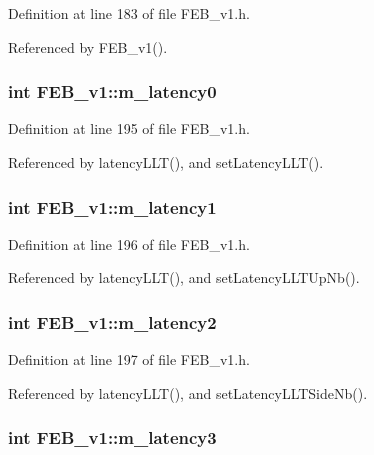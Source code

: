 Definition at line 183 of file FEB\_\-v1.h.

Referenced by FEB\_\-v1().\hypertarget{classFEB__v1_a23a3d8bfbf96490890140f13b08a02c1}{
\subsubsection[{m\_\-latency0}]{\setlength{\rightskip}{0pt plus 5cm}int {\bf FEB\_\-v1::m\_\-latency0}}}
\label{classFEB__v1_a23a3d8bfbf96490890140f13b08a02c1}


Definition at line 195 of file FEB\_\-v1.h.

Referenced by latencyLLT(), and setLatencyLLT().\hypertarget{classFEB__v1_a026d2f4973bf3ddbc404e35264fdef1f}{
\subsubsection[{m\_\-latency1}]{\setlength{\rightskip}{0pt plus 5cm}int {\bf FEB\_\-v1::m\_\-latency1}}}
\label{classFEB__v1_a026d2f4973bf3ddbc404e35264fdef1f}


Definition at line 196 of file FEB\_\-v1.h.

Referenced by latencyLLT(), and setLatencyLLTUpNb().\hypertarget{classFEB__v1_a2c4b18efd76de3bf7089bba57fb6744f}{
\subsubsection[{m\_\-latency2}]{\setlength{\rightskip}{0pt plus 5cm}int {\bf FEB\_\-v1::m\_\-latency2}}}
\label{classFEB__v1_a2c4b18efd76de3bf7089bba57fb6744f}


Definition at line 197 of file FEB\_\-v1.h.

Referenced by latencyLLT(), and setLatencyLLTSideNb().\hypertarget{classFEB__v1_a2f71bdcef05c845177a62610da490bf9}{
\subsubsection[{m\_\-latency3}]{\setlength{\rightskip}{0pt plus 5cm}int {\bf FEB\_\-v1::m\_\-latency3}}}
\label{classFEB__v1_a2f71bdcef05c845177a62610da490bf9}


